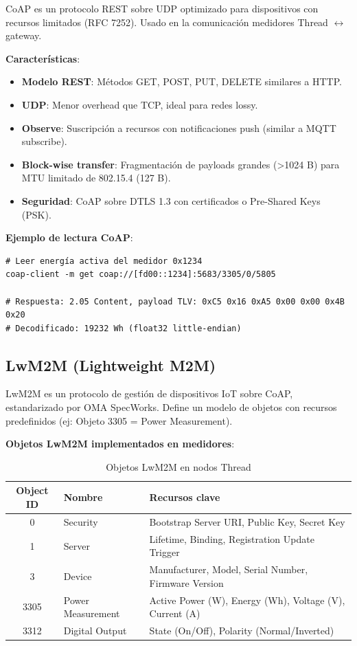 CoAP es un protocolo REST sobre UDP optimizado para dispositivos con recursos limitados (RFC 7252). Usado en la comunicación medidores Thread $\leftrightarrow$ gateway.

\textbf{Características}:
\begin{itemize}
    \item \textbf{Modelo REST}: Métodos GET, POST, PUT, DELETE similares a HTTP.
    \item \textbf{UDP}: Menor overhead que TCP, ideal para redes lossy.
    \item \textbf{Observe}: Suscripción a recursos con notificaciones push (similar a MQTT subscribe).
    \item \textbf{Block-wise transfer}: Fragmentación de payloads grandes (>1024 B) para MTU limitado de 802.15.4 (127 B).
    \item \textbf{Seguridad}: CoAP sobre DTLS 1.3 con certificados o Pre-Shared Keys (PSK).
\end{itemize}

\textbf{Ejemplo de lectura CoAP}:
\begin{verbatim}
# Leer energía activa del medidor 0x1234
coap-client -m get coap://[fd00::1234]:5683/3305/0/5805

# Respuesta: 2.05 Content, payload TLV: 0xC5 0x16 0xA5 0x00 0x00 0x4B 0x20
# Decodificado: 19232 Wh (float32 little-endian)
\end{verbatim}

\subsection{LwM2M (Lightweight M2M)}

LwM2M es un protocolo de gestión de dispositivos IoT sobre CoAP, estandarizado por OMA SpecWorks. Define un modelo de objetos con recursos predefinidos (ej: Objeto 3305 = Power Measurement).

\textbf{Objetos LwM2M implementados en medidores}:
\begin{table}[h]
\centering
\caption{Objetos LwM2M en nodos Thread}
\begin{tabular}{|c|l|p{7cm}|}
\hline
\textbf{Object ID} & \textbf{Nombre} & \textbf{Recursos clave} \\ \hline
0 & Security & Bootstrap Server URI, Public Key, Secret Key \\ \hline
1 & Server & Lifetime, Binding, Registration Update Trigger \\ \hline
3 & Device & Manufacturer, Model, Serial Number, Firmware Version \\ \hline
3305 & Power Measurement & Active Power (W), Energy (Wh), Voltage (V), Current (A) \\ \hline
3312 & Digital Output & State (On/Off), Polarity (Normal/Inverted) \\ \hline
\end{tabular}
\end{table}

